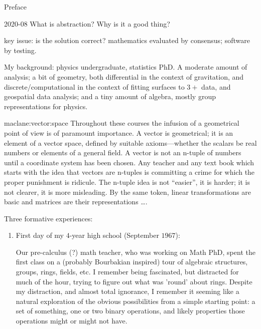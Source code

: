 \begin{plSection}{Preface}
\begin{plSection}{2020-08}
What is abstraction? Why is it a good thing? 

key issue: is the solution correct?
mathematics evaluated by consensus;
software by testing.

My background: physics undergraduate, statistics PhD.
A moderate amount of analysis; 
a bit of geometry, both
differential in the context of gravitation, and
discrete/computational in the context of fitting surfaces to
$3+$ data, and geospatial data analysis;
and a tiny amount of algebra, mostly group representations
for physics.

\begin{plQuote}
{}
{maclane:vector:space}
Throughout these courses the infusion of a geometrical
point of view is of paramount importance. A vector
is geometrical; it is an element of a vector space, defined
by suitable axioms—whether the scalars be real numbers or
elements of a general field. A vector is not an n-tuple of
numbers until a coordinate system has been chosen. Any
teacher and any text book which starts with the idea that vectors
are n-tuples is committing a crime for which the proper
punishment is ridicule. The n-tuple idea is not ``easier'', it is
harder; it is not clearer, it is more misleading. By the same
token, linear transformations are basic and matrices are their
representations {\ldots}.
\end{plQuote}

Three formative experiences:
\begin{enumerate}
  \item First day of my $4$-year high school (September $1967$):
  \par
  Our pre-calculus (?) math teacher, who was working on Math PhD,
  spent the first class on a (probably Bourbakian inspired) tour 
  of algebraic structures, groups, rings, fields, etc.
  I remember being fascinated, but distracted for much of the hour, 
  trying to figure out what was 'round' about rings.
  Despite my distraction, and almost total ignorance, 
  I remember it seeming like a natural exploration of the obvious
  possibilities from a simple starting point: a set of something,
  one or two binary operations, and likely properties those
  operations might or might not have.
 

\end{enumerate}
\end{plSection}
\end{plSection}
